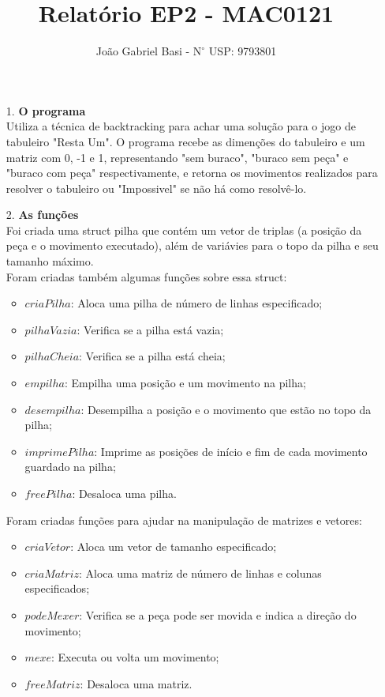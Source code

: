 \documentclass[12pt, a4paper]{article} %
\title{Relatório EP2 - MAC0121}
\date{}
\author{João Gabriel Basi - $\text{N}^\circ$ USP: 9793801}
\begin{document}
\maketitle
\begin{enumerate}
\large
\item[1.]\textbf{O programa}
\normalsize\\[0.5cm]
Utiliza a técnica de backtracking para achar uma solução para o jogo de tabuleiro "Resta Um". O programa recebe as dimenções do tabuleiro e um matriz com 0, -1 e 1, representando "sem buraco", "buraco sem peça" e "buraco com peça" respectivamente, e retorna os movimentos realizados para resolver o tabuleiro ou "Impossivel" se não há como resolvê-lo.\\
\large
\item[2.]\textbf{As funções}
\normalsize\\[0.5cm]
Foi criada uma struct pilha que contém um vetor de triplas (a posição da peça e o movimento executado), além de variávies para o topo da pilha e seu tamanho máximo.\\
Foram criadas também algumas funções sobre essa struct:
\begin{itemize}
\item $criaPilha$: Aloca uma pilha de número de linhas especificado;
\item $pilhaVazia$: Verifica se a pilha está vazia;
\item $pilhaCheia$: Verifica se a pilha está cheia;
\item $empilha$: Empilha uma posição e um movimento na pilha;
\item $desempilha$: Desempilha a posição e o movimento que estão no topo da pilha;
\item $imprimePilha$: Imprime as posições de início e fim de cada movimento guardado na pilha;
\item $freePilha$: Desaloca uma pilha.
\end{itemize}
Foram criadas funções para ajudar na manipulação de matrizes e vetores:
\begin{itemize}
\item $criaVetor$: Aloca um vetor de tamanho especificado;
\item $criaMatriz$: Aloca uma matriz de número de linhas e colunas especificados;
\item $podeMexer$: Verifica se a peça pode ser movida e indica a direção do movimento;
\item $mexe$: Executa ou volta um movimento;
\item $freeMatriz$: Desaloca uma matriz.

\end{itemize}
\end{enumerate}
\end{document}
